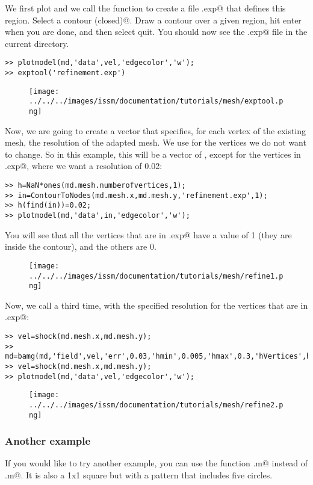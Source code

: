 We first plot \verb@vel@ and we call the function \verb@exptool@ to create a file \verb@refinement.exp@ that defines this region. Select \verb@add a contour (closed)@. Draw a contour over a given region, hit enter when you are done, and then select quit. You should now see the \verb@refinement.exp@ file in the current directory.
\begin{verbatim}>> plotmodel(md,'data',vel,'edgecolor','w');
>> exptool('refinement.exp')
\end{verbatim}
\begin{figure}[H]
	\begin{center}
		\texttt{[image: ../../../images/issm/documentation/tutorials/mesh/exptool.png]}
	\end{center}
\end{figure}

Now, we are going to create a vector that specifies, for each vertex of the existing mesh, the resolution of the adapted mesh. We use \verb@NaN@ for the vertices we do not want to change. So in this example, this will be a vector of \verb@NaN@, except for the vertices in \verb@refinement.exp@, where we want a resolution of 0.02:
\begin{verbatim}>> h=NaN*ones(md.mesh.numberofvertices,1);
>> in=ContourToNodes(md.mesh.x,md.mesh.y,'refinement.exp',1);
>> h(find(in))=0.02;
>> plotmodel(md,'data',in,'edgecolor','w');
\end{verbatim}
You will see that all the vertices that are in \verb@refinement.exp@ have a value of 1 (they are inside the contour), and the others are 0.
\begin{figure}[H]
	\begin{center}
		\texttt{[image: ../../../images/issm/documentation/tutorials/mesh/refine1.png]}
	\end{center}
\end{figure}

Now, we call \verb@bamg@ a third time, with the specified resolution for the vertices that are in \verb@refinement.exp@:
\begin{verbatim}>> vel=shock(md.mesh.x,md.mesh.y);
>> md=bamg(md,'field',vel,'err',0.03,'hmin',0.005,'hmax',0.3,'hVertices',h);
>> vel=shock(md.mesh.x,md.mesh.y);
>> plotmodel(md,'data',vel,'edgecolor','w');
\end{verbatim}
\begin{figure}[H]
	\begin{center}
		\texttt{[image: ../../../images/issm/documentation/tutorials/mesh/refine2.png]}
	\end{center}
\end{figure}
\subsubsection{Another example}%
If you would like to try another example, you can use the function \verb@circles.m@ instead of
\verb@shock.m@. It is also a 1x1 square but with a pattern that includes five circles.
